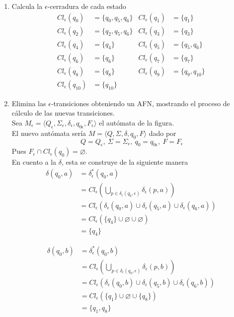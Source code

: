 \documentclass{article}
\begin{document}
\begin{enumerate}
{    		\begin{enumerate}
    			\item {
    				Calcula la $\epsilon$-cerradura de cada estado
    				\begin{align*}
    					Cl_{\epsilon}(q_{0}) &= \{q_{0}, q_{5}, q_{6}\}
    					&Cl_{\epsilon}(q_{1}) &= \{q_{1}\} \\
    					Cl_{\epsilon}(q_{2}) &= \{q_{2}, q_{5}, q_{6}\}
    					&Cl_{\epsilon}(q_{3}) &= \{q_{3}\} \\
    					Cl_{\epsilon}(q_{4}) &= \{q_{4}\}
    					&Cl_{\epsilon}(q_{5}) &= \{q_{5}, q_{6}\} \\
    					Cl_{\epsilon}(q_{6}) &= \{q_{6}\}
    					&Cl_{\epsilon}(q_{7}) &= \{q_{7}\} \\
    					Cl_{\epsilon}(q_{8}) &= \{q_{8}\}
    					&Cl_{\epsilon}(q_{9}) &= \{q_{9}, q_{10}\} \\
    					Cl_{\epsilon}(q_{10}) &= \{q_{10}\} 
    				\end{align*}
				}
				\item {
					Elimina las $\epsilon$-transiciones obteniendo un AFN, 
					mostrando el proceso de cálculo de las nuevas transiciones.\\
					Sea $M_{\epsilon} = \langle Q_{\epsilon}, \Sigma_{\epsilon},
					\delta_{\epsilon}, q_{0\epsilon}, F_{\epsilon} \rangle$ el 
					autómata de la figura.\\
					El nuevo autómata sería $M = \langle Q, \Sigma, \delta, 
					q_{0}, F \rangle$ dado por 
					\[\ Q = Q_{\epsilon},\ \Sigma = \Sigma_{\epsilon},
					\ q_0 = q_{0\epsilon},\ F = F_{\epsilon}\]
					Pues $F_{\epsilon} \cap Cl_{\epsilon}(q_{0}) = \varnothing$.\\
					En cuento a la $\delta$, esta se construye de la siguiente 
					manera
					\begin{align*}
						\delta(q_{0}, a) &= \delta^{*}_{\epsilon}(q_{0}, a) \\
						&= Cl_{\epsilon}(\bigcup_{p \in \delta_{\epsilon}(q_{0}, \epsilon)}
						{\delta_{\epsilon}(p, a)}) \\
						&= Cl_{\epsilon}(\delta_{\epsilon}(q_{0}, a) 
						\cup \delta_{\epsilon}(q_{5}, a)
						\cup \delta_{\epsilon}(q_{6}, a))\\
						&= Cl_{\epsilon}(\{q_{4}\} \cup \varnothing \cup \varnothing)\\
						&= \{q_{4}\}
					\end{align*}

					\begin{align*}
						\delta(q_{0}, b) &= \delta^{*}_{\epsilon}(q_{0}, b) \\
						&= Cl_{\epsilon}(\bigcup_{p \in \delta_{\epsilon}(q_{0}, \epsilon)}
						{\delta_{\epsilon}(p, b)}) \\
						&= Cl_{\epsilon}(\delta_{\epsilon}(q_{0}, b) 
						\cup \delta_{\epsilon}(q_{5}, b)
						\cup \delta_{\epsilon}(q_{6}, b))\\
						&= Cl_{\epsilon}(\{q_{1}\} \cup \varnothing \cup \{q_{8}\})\\
						&= \{q_{1}, q_{8}\}
					\end{align*}

}
\end{enumerate}}
\end{enumerate}
\end{document}
